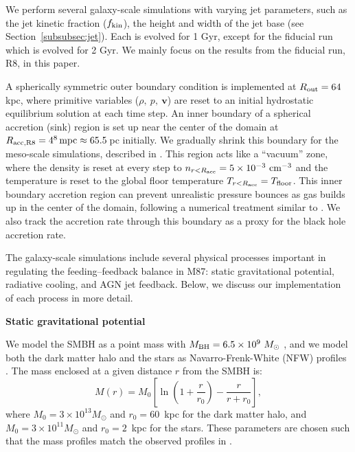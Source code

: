 We perform several galaxy-scale simulations with varying jet parameters, such as the jet kinetic fraction ($f_{\rm kin}$), the height and width of the jet base (see Section~\ref{subsubsec:jet}). Each is evolved for 1 Gyr, except for the fiducial run which is evolved for 2 Gyr.
We mainly focus on the results from the fiducial run, R8, in this paper.

A spherically symmetric outer boundary condition is implemented at $R_{\rm out} = 64$\,kpc, where primitive variables ($\rho,\ p,\ \mathbf{v}$) are reset to an initial hydrostatic equilibrium solution at each time step.
An inner boundary of a spherical accretion (sink) region is set up near the center of the domain at $R_{\rm acc,R8} = 4^8\,\mathrm{mpc}\approx 65.5$\,pc initially. We gradually shrink this boundary for the meso-scale simulations, described in .
This region acts like a ``vacuum'' zone, where the density is reset at every step to $n_{r < R_{\rm acc}} = 5\times 10^{-3}~\mathrm{cm^{-3}}$ and the temperature is reset to the global floor temperature $T_{r < R_{\rm acc}} = T_{\rm floor}$.
This inner boundary accretion region can prevent unrealistic pressure bounces as gas builds up in the center of the domain, following a numerical treatment similar to \citet{guo_toward_2023}. We also track the accretion rate through this boundary as a proxy for the black hole accretion rate.

The galaxy-scale simulations include several physical processes important in regulating the feeding--feedback balance in M87: static gravitational potential, radiative cooling, and AGN jet feedback.
Below, we discuss our implementation of each process in more detail.

\centerline{\textbf{Static gravitational potential}} \label{subsubsec:grav}


We model the SMBH as a point mass with $M_{\rm BH} = 6.5 \times 10^9~M_{\odot}$ \citep[e.g.,][]{eht_six}, and we model both the dark matter halo and the stars as Navarro-Frenk-White (NFW) profiles \citep{navarro_structure_1996}.
The mass enclosed at a given distance $r$ from the SMBH is:
\begin{equation}
\label{eq:mass}
    M(r) = M_0 \left[\ln(1 + \frac{r}{r_0}) - \frac{r}{r + r_0}\right],
\end{equation}
where $M_0 = 3\times10^{13} M_{\odot}$ and $r_0 = 60$~kpc for the dark matter halo, and $M_0 = 3\times10^{11} M_{\odot}$ and $r_0 = 2$~kpc for the stars.
These parameters are chosen such that the mass profiles match the observed profiles in \citet{gebhardt_black_2009}.

